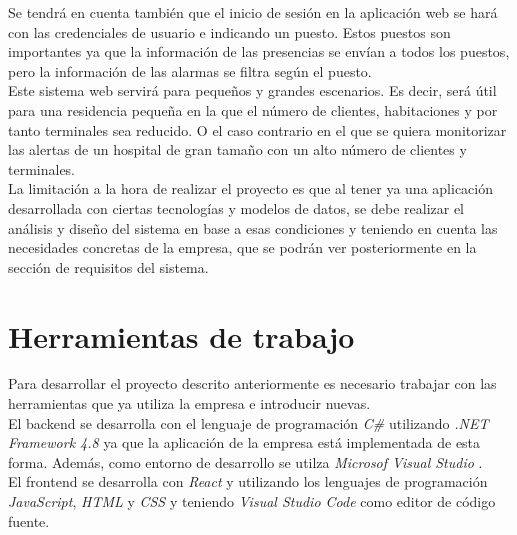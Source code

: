 Se tendrá en cuenta también que el inicio de sesión en la aplicación web se hará con las credenciales de usuario e indicando un puesto. Estos puestos son importantes ya que la información de las presencias se envían a todos los puestos, pero la información de las alarmas se filtra según el puesto.\\

Este sistema web servirá para pequeños y grandes escenarios. Es decir, será útil para una residencia pequeña en la que el número de clientes, habitaciones y por tanto terminales sea reducido. O el caso contrario en el que se quiera monitorizar las alertas de un hospital de gran tamaño con un alto número de clientes y terminales.\\


La limitación a la hora de realizar el proyecto es que al tener ya una aplicación desarrollada con ciertas tecnologías y modelos de datos, se debe realizar el análisis y diseño del sistema en base a esas condiciones y teniendo en cuenta las necesidades concretas de la empresa, que se podrán ver posteriormente en la sección de requisitos del sistema.


\section{Herramientas de trabajo}


Para desarrollar el proyecto descrito anteriormente es necesario trabajar con las herramientas que ya utiliza la empresa e introducir nuevas.\\

El backend se desarrolla con el lenguaje de programación \textit{C\#} utilizando \textit{.NET Framework 4.8} \cite{net-framework} ya que la aplicación de la empresa está implementada de esta forma. Además, como entorno de desarrollo se utilza \textit{Microsof Visual Studio} \cite{vs}.\\

El frontend se desarrolla con \textit{React} \cite{react} y utilizando los lenguajes de programación \textit{JavaScript}, \textit{HTML} y \textit{CSS} y teniendo \textit{Visual Studio Code} \cite{vscode} como editor de código fuente.\\

